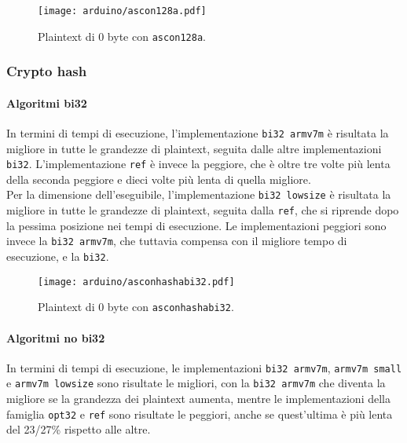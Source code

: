 \begin{figure}[H]
    \centering
    \texttt{[image: arduino/ascon128a.pdf]}
    \caption{Plaintext di 0 byte con \texttt{ascon128a}.}
\end{figure}

\subsubsection{Crypto hash}

\paragraph{Algoritmi bi32}

In termini di tempi di esecuzione, l'implementazione \texttt{bi32 armv7m} è risultata la migliore in tutte le grandezze di plaintext, seguita dalle altre implementazioni \texttt{bi32}. L'implementazione \texttt{ref} è invece la peggiore, che è oltre tre volte più lenta della seconda peggiore e dieci volte più lenta di quella migliore. \\

\noindent Per la dimensione dell'eseguibile, l'implementazione \texttt{bi32 lowsize} è risultata la migliore in tutte le grandezze di plaintext, seguita dalla \texttt{ref}, che si riprende dopo la pessima posizione nei tempi di esecuzione. Le implementazioni peggiori sono invece la \texttt{bi32 armv7m}, che tuttavia compensa con il migliore tempo di esecuzione, e la \texttt{bi32}.

\begin{figure}[H]
    \centering
    \texttt{[image: arduino/asconhashabi32.pdf]}
    \caption{Plaintext di 0 byte con \texttt{asconhashabi32}.}
\end{figure}

\paragraph{Algoritmi no bi32}

In termini di tempi di esecuzione, le implementazioni \texttt{bi32 armv7m}, \texttt{armv7m small} e \texttt{armv7m lowsize} sono risultate le migliori, con la \texttt{bi32 armv7m} che diventa la migliore se la grandezza dei plaintext aumenta, mentre le implementazioni della famiglia \texttt{opt32} e \texttt{ref} sono risultate le peggiori, anche se quest'ultima è più lenta del 23/27\% rispetto alle altre. \\

